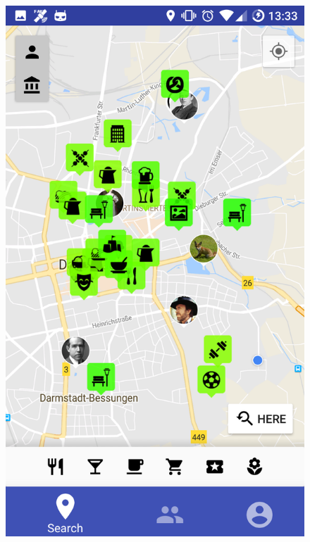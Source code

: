 \documentclass[11pt, accentcolor=tud1c]{tudreport}
\begin{document}
\begin{figure}[h]
\centering
\begin{minipage}{.3\textwidth}
  \centering
  \includegraphics[width=.8\linewidth]{./res/map_user_venues.png}
  \label{fig:user_profile}
\end{minipage}%
\begin{minipage}{.3\textwidth}
  \centering

\end{minipage}
\end{figure}
\end{document}
